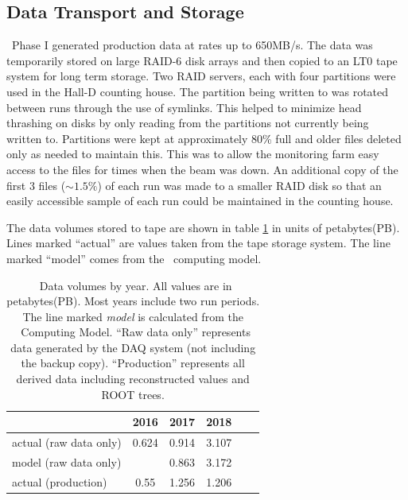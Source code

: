 \subsection{Data Transport and Storage \label{sec:onlineprocessing}}

\GX ~Phase I generated production data at rates up to 650MB/s. The data was temporarily stored on large RAID-6 disk arrays and then copied to an LT0 tape system for long term storage. Two RAID servers, each with four partitions were used in the Hall-D counting house. The partition being written to was rotated between runs through the use of symlinks. This helped to minimize head thrashing on disks by only reading from the partitions not currently being written to. Partitions were kept at approximately 80\% full and older files deleted only as needed to maintain this. This was to allow the monitoring farm easy access to the files for times when the beam was down. An additional copy of the first 3 files ($\sim1.5\%$) of each run was made to a smaller RAID disk so that an easily accessible sample of each run could be maintained in the counting house.

The data volumes stored to tape are shown in table \ref{tab:online_data_volumes} in units of petabytes(PB). Lines marked ``actual'' are values taken from the tape storage system. The line marked ``model'' comes from the \GX ~computing model\cite{gx3821}.

\begin{table}[]
    \centering
    \begin{tabular}{|l|c|c|c|c|c|}
    \hline
                           & \textbf{2016}  & \textbf{2017}  & \textbf{2018} \\
    \hline
    actual (raw data only) & 0.624 & 0.914 & 3.107 \\
    \hline
     model (raw data only) &       & 0.863 & 3.172 \\
    \hline
    \hline
    actual (production)    & 0.55  & 1.256 & 1.206 \\
    \hline
    \end{tabular}
    \caption{\GX ~Data volumes by year. All values are in petabytes(PB). Most years include two run periods. The line marked \textit{model} is calculated from the \GX ~Computing Model\cite{gx3821}. ``Raw data only'' represents data generated by the DAQ system (not including the backup copy). ``Production'' represents all derived data including reconstructed values and ROOT trees. }
    \label{tab:online_data_volumes}
\end{table}

